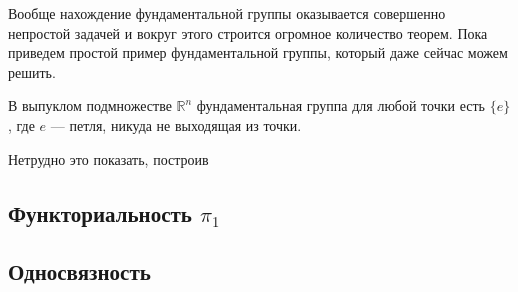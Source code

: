 Вообще нахождение фундаментальной группы оказывается совершенно непростой задачей и вокруг этого строится огромное количество теорем. Пока приведем простой пример фундаментальной группы, который даже сейчас можем решить.

\begin{Ex}
    В выпуклом подмножестве $\mathbb{R}^n$ фундаментальная группа для любой точки есть  $\{e\}$, где $e$ --- петля, никуда не выходящая из точки.

    Нетрудно это показать, построив 
\end{Ex}



\subsection{Функториальность $\pi_1$ }
\subsection{Односвязность}

